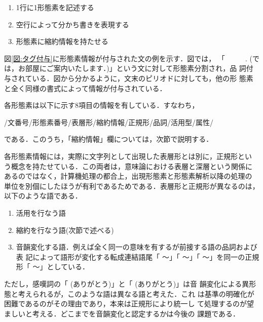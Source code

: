 \begin{enumerate}
\item 1行に1形態素を記述する
\item 空行によって分かち書きを表現する
\item 形態素に縮約情報を持たせる
\end{enumerate}

図\ref{図:タグ付与}に形態素情報が付与された文の例を示す．図では，
「
\verb*| |
\verb*| |
\verb*| |
.
(では，お部屋にご案内いたします．)」という文に対して形態素分割され，品
詞付与されている．図から分かるように，文末のピリオドに対しても，他の形
態素と全く同様の書式によって情報が付与されている．

各形態素は以下に示す8項目の情報を有している．すなわち，

\centerline{/文番号/形態素番号/表層形/縮約情報/正規形/品詞/活用型/属性/}

である．このうち，「縮約情報」欄については，次節で説明する．

各形態素情報には，実際に文字列として出現した表層形とは別に，正規形とい
う概念を持たせている．この両者は，意味論における表層と深層という関係に
あるのではなく，計算機処理の都合上，出現形態素と形態素解析以降の処理の
単位を別個にしたほうが有利であるためである．表層形と正規形が異なるのは，
以下のような語である．

\begin{enumerate}
\item 活用を行なう語
\item 縮約を行なう語(次節で述べる)
\item 
音韻変化する語．例えば全く同一の意味を有するが前接する語の品詞および表
記によって語形が変化する転成連結語尾「
〜」「
〜」「
〜」を同一の正規形「
〜」としている．
\end{enumerate}

ただし，感嘆詞の「
(ありがとう)」と「
(ありがとう)」は音
韻変化による異形態と考えられるが，このような語は異なる語と考えた．これ
は基準の明確化が困難であるのがその理由であり，本来は正規形により統一し
て処理するのが望ましいと考える．どこまでを音韻変化と認定するかは今後の
課題である．


